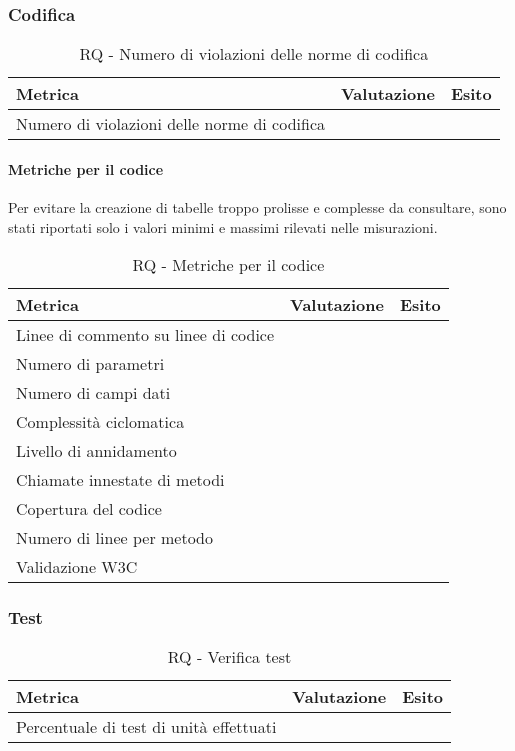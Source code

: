 \documentclass[../PianoDiQualifica.tex]{subfiles}
\begin{document}
				\subsubsection{Codifica}
					\begin{table}[H]
					\center
						\begin{tabular}{|l|c|c|}
							\hline
							\rowcolor{blue!30}\textbf{Metrica} & \textbf{Valutazione} & \textbf{Esito} \\ \hline
							Numero di violazioni delle norme di codifica &  &  \\ \hline
						\end{tabular}
					\caption{RQ - Numero di violazioni delle norme di codifica}
					\end{table}
					\paragraph{Metriche per il codice\\}
						Per evitare la creazione di tabelle troppo prolisse e complesse da consultare,
						sono stati riportati solo i valori minimi e massimi rilevati nelle misurazioni.
						\begin{table}[H]
						\center
							\begin{tabular}{|l|c|c|}
								\hline
								\rowcolor{blue!30}\textbf{Metrica} & \textbf{Valutazione} & \textbf{Esito} \\ \hline
								Linee di commento su linee di codice &  &  \\ \hline
								Numero di parametri &  &  \\ \hline
								Numero di campi dati &  &  \\ \hline
								Complessità ciclomatica &  &  \\ \hline
								Livello di annidamento &  &  \\ \hline
								Chiamate innestate di metodi &  &  \\ \hline
								Copertura del codice &  &  \\ \hline
								Numero di linee per metodo &  &  \\ \hline
								Validazione W3C &  &  \\ \hline
							\end{tabular}
						\caption{RQ - Metriche per il codice}
						\end{table}
				\subsubsection{Test}
					\begin{table}[H]
					\center
						\begin{tabular}{|l|c|c|}
							\hline
							\rowcolor{blue!30}\textbf{Metrica} & \textbf{Valutazione} & \textbf{Esito} \\ \hline
							Percentuale di test di unità effettuati &  &  \\ \hline
						\end{tabular}
					\caption{RQ - Verifica test}
					\end{table}
\end{document}
